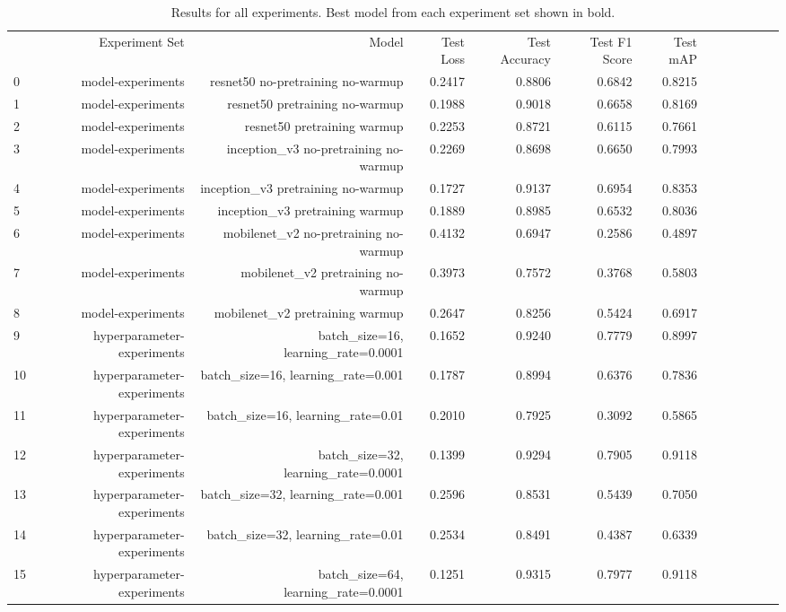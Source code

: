 \begin{table}[h!]
\caption{Results for all experiments. Best model from each experiment set shown in bold.}
\label{tab:all_results}
\begin{tabular}{lrrrrrrrrrrrr}
 & Experiment Set & Model & Test Loss & Test Accuracy & Test F1 Score & Test mAP \\
0 & model-experiments & resnet50 no-pretraining no-warmup & 0.2417 & 0.8806 & 0.6842 & 0.8215 \\
1 & model-experiments & resnet50 pretraining no-warmup & 0.1988 & 0.9018 & 0.6658 & 0.8169 \\
2 & model-experiments & resnet50 pretraining warmup & 0.2253 & 0.8721 & 0.6115 & 0.7661 \\
3 & model-experiments & inception\_v3 no-pretraining no-warmup & 0.2269 & 0.8698 & 0.6650 & 0.7993 \\
4 & model-experiments & inception\_v3 pretraining no-warmup & 0.1727 & 0.9137 & 0.6954 & 0.8353 \\
5 & model-experiments & inception\_v3 pretraining warmup & 0.1889 & 0.8985 & 0.6532 & 0.8036 \\
6 & model-experiments & mobilenet\_v2 no-pretraining no-warmup & 0.4132 & 0.6947 & 0.2586 & 0.4897 \\
7 & model-experiments & mobilenet\_v2 pretraining no-warmup & 0.3973 & 0.7572 & 0.3768 & 0.5803 \\
8 & model-experiments & mobilenet\_v2 pretraining warmup & 0.2647 & 0.8256 & 0.5424 & 0.6917 \\
9 & hyperparameter-experiments & batch\_size=16, learning\_rate=0.0001 & 0.1652 & 0.9240 & 0.7779 & 0.8997 \\
10 & hyperparameter-experiments & batch\_size=16, learning\_rate=0.001 & 0.1787 & 0.8994 & 0.6376 & 0.7836 \\
11 & hyperparameter-experiments & batch\_size=16, learning\_rate=0.01 & 0.2010 & 0.7925 & 0.3092 & 0.5865 \\
12 & hyperparameter-experiments & batch\_size=32, learning\_rate=0.0001 & 0.1399 & 0.9294 & 0.7905 & 0.9118 \\
13 & hyperparameter-experiments & batch\_size=32, learning\_rate=0.001 & 0.2596 & 0.8531 & 0.5439 & 0.7050 \\
14 & hyperparameter-experiments & batch\_size=32, learning\_rate=0.01 & 0.2534 & 0.8491 & 0.4387 & 0.6339 \\
15 & hyperparameter-experiments & batch\_size=64, learning\_rate=0.0001 & 0.1251 & 0.9315 & 0.7977 & 0.9118 \\

\end{tabular}
\end{table}
